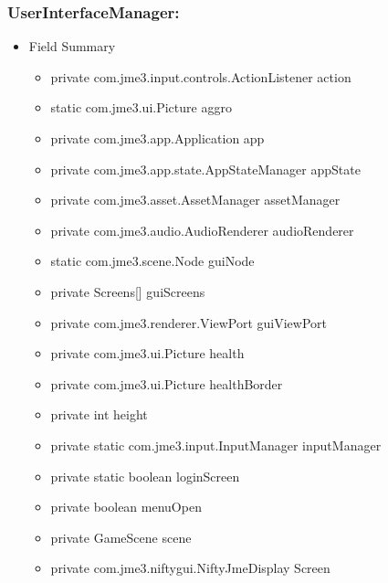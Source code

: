 \documentclass[letterpaper]{article}
\begin{document}
						\subsubsection*{UserInterfaceManager:}
						\vspace{0.1in}	
							\begin{itemize}
								\item	Field Summary
										\begin{itemize}
											\item	private com.jme3.input.controls.ActionListener 	action 
\item static com.jme3.ui.Picture 	aggro 
 
\item private com.jme3.app.Application 	app 
 
\item private com.jme3.app.state.AppStateManager 	appState 
 
\item private com.jme3.asset.AssetManager 	assetManager 
 
\item private com.jme3.audio.AudioRenderer 	audioRenderer 
 
\item static com.jme3.scene.Node 	guiNode 
 
\item private Screens[] 	guiScreens 
 
\item private com.jme3.renderer.ViewPort 	guiViewPort 
 
\item private com.jme3.ui.Picture 	health 
 
\item private com.jme3.ui.Picture 	healthBorder 
 
\item private int 	height 
 
\item private static com.jme3.input.InputManager 	inputManager 
 
\item private static boolean 	loginScreen 
 
\item private boolean 	menuOpen 
 
\item private GameScene 	scene 
 
\item private com.jme3.niftygui.NiftyJmeDisplay 	Screen 
 

\end{itemize}
\end{itemize}
\end{document}
